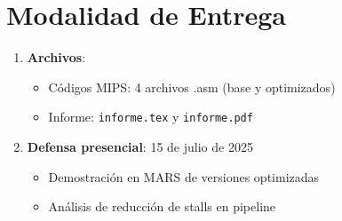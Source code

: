 \documentclass{article}
\begin{document}
\section*{Modalidad de Entrega}
\begin{enumerate}
  \item \textbf{Archivos}:
  \begin{itemize}
    \item Códigos MIPS: 4 archivos .asm (base y optimizados)
    \item Informe: \texttt{informe.tex} y \texttt{informe.pdf}
  \end{itemize}
  
  \item \textbf{Defensa presencial}: 15 de julio de 2025
  \begin{itemize}
    \item Demostración en MARS de versiones optimizadas
    \item Análisis de reducción de stalls en pipeline
  \end{itemize}
\end{enumerate}
\end{document}
